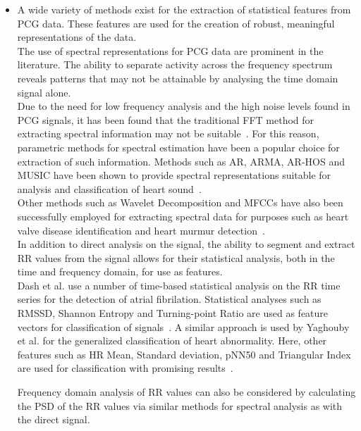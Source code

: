 \documentclass[titlepage]{scrartcl}
\begin{document}
\begin{itemize}
    \item A wide variety of methods exist for the extraction of statistical
        features from PCG data. These features are used for the creation of
        robust, meaningful representations of the data.\\
        The use of spectral representations for PCG data are prominent in the
        literature. The ability to separate activity across the frequency
        spectrum reveals patterns that may not be attainable by analysing the
        time domain signal alone.\\
        Due to the need for low frequency analysis and the high noise levels
        found in PCG signals, it has been found that the traditional FFT
        method for extracting spectral information may not be
        suitable~\parencite{Akay1990}. For this reason, parametric methods for
        spectral estimation have been a popular choice for extraction of such information. 
        Methods such as AR, ARMA, AR-HOS and MUSIC have been shown to provide spectral
        representations suitable for analysis and classification of heart
        sound~\parencite{Ergen2001, Schmidt2015}.\\
        Other methods such as Wavelet Decomposition and MFCCs have also been
        successfully  employed for extracting spectral data for purposes such
        as heart valve disease identification and heart murmur
        detection~\parencite{Quiceno-Manrique2010a, Maglogiannis2009}.\\
        
        In addition to direct analysis on the signal, the ability to segment
        and extract RR values from the signal allows for their statistical
        analysis, both in the time and frequency domain, for use as features.\\
        Dash et al. use a number of time-based statistical analysis on the RR
        time series for the detection of atrial fibrilation. Statistical
        analyses such as RMSSD, Shannon Entropy and Turning-point Ratio are
        used as feature vectors for classification of
        signals~\parencite{Dash2009}.  A similar approach is used by Yaghouby
        et al. for the generalized classification of heart abnormality. Here,
        other features such as HR Mean, Standard deviation, pNN50 and
        Triangular Index are used for classification with promising
        results~\parencite{Yaghouby2009}.

        Frequency domain analysis of RR values can also be considered by
        calculating the PSD of the RR values via similar methods for spectral
        analysis as with the direct signal.


\end{itemize}
\end{document}

